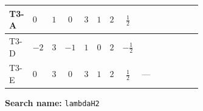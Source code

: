 \documentclass[8pt]{article}
\begin{document}
\begin{landscape}
\begin{longtable}{@{}llcccccc >{\raggedright\arraybackslash}p{0.21\linewidth} >{\raggedright\arraybackslash}p{0.21\linewidth} >{\raggedright\arraybackslash}p{0.21\linewidth}@{}}
\midrule
T3-A & $0$ & $1$ & $0$ & $3$ & $1$ & $2$ & $\frac{1}{2}$ & \scriptsize\adjustbox{max width=\linewidth}{$\begin{gathered} +2 {\lambda_{12}} {\lambda_{H1}}\end{gathered}$} & \scriptsize\adjustbox{max width=\linewidth}{$\begin{gathered} +6 {\lambda_H} {\lambda_{H2}}\end{gathered}$} & \scriptsize\adjustbox{max width=\linewidth}{$\begin{gathered} +4 {\lambda_{H2}}^2\end{gathered}$} \\
\midrule
T3-D & $-2$ & $3$ & $-1$ & $1$ & $0$ & $2$ & $-\frac{1}{2}$ & \scriptsize\adjustbox{max width=\linewidth}{$\begin{gathered} +6 {\lambda_{12}} {\lambda_{H1}}\end{gathered}$} & \scriptsize\adjustbox{max width=\linewidth}{$\begin{gathered} +6 {\lambda_H} {\lambda_{H2}}\end{gathered}$} & \scriptsize\adjustbox{max width=\linewidth}{$\begin{gathered} +4 {\lambda_{H2}}^2\end{gathered}$} \\
\midrule
T3-E & $0$ & $3$ & $0$ & $3$ & $1$ & $2$ & $\frac{1}{2}$ & --- & \scriptsize\adjustbox{max width=\linewidth}{$\begin{gathered} +6 {\lambda_H} {\lambda_{H2}}\end{gathered}$} & \scriptsize\adjustbox{max width=\linewidth}{$\begin{gathered} +4 {\lambda_{H2}}^2\end{gathered}$} \\
\midrule
\bottomrule
\end{longtable}
\clearpage
\noindent\textbf{Search name: }\texttt{lambdaH2}\par\smallskip

\end{landscape}
\end{document}
